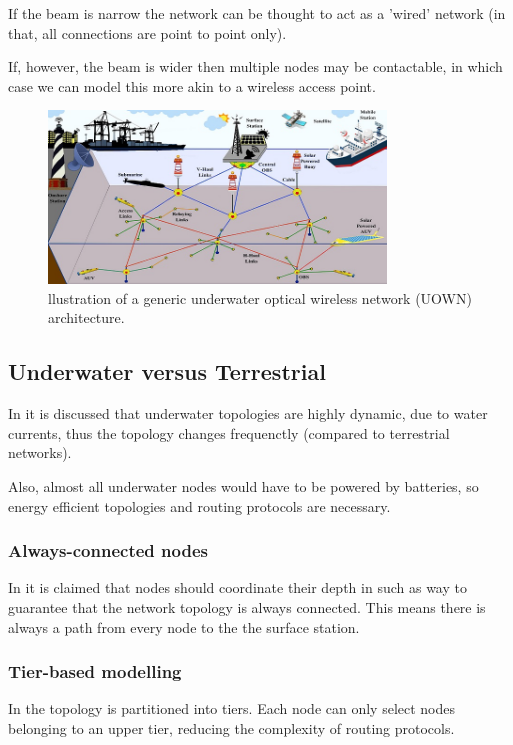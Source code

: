 If the beam is narrow the network can be thought to act as a 'wired' network
(in that, all connections are point to point only).

If, however, the beam is wider then multiple nodes may be contactable, in which
case we can model this more akin to a wireless access point.

\begin{figure}[H]
  \includegraphics[width=0.8\textwidth]{underwater_network_topologies_v2.jpg}
  \caption{llustration of a generic underwater optical wireless network (UOWN) architecture.}
  \label{fig:underwater_network_topologies_v2}
\end{figure}

\subsection{Underwater versus Terrestrial}
In \cite{s16030414} it is discussed that underwater topologies are highly
dynamic, due to water currents, thus the topology changes frequenctly
(compared to terrestrial networks).

Also, almost all underwater nodes would have to be powered by batteries,
so energy efficient topologies and routing protocols are necessary.

\subsubsection{Always-connected nodes}
In \cite{POMPILI2009778} it is claimed that nodes should coordinate their
depth in such as way to guarantee that the network topology is always connected.
This means there is always a path from every node to the the surface station.

\subsubsection{Tier-based modelling}
In \cite{tier_based_underwater_routing} the topology is partitioned into tiers.
Each node can only select nodes belonging to an upper tier, reducing the
complexity of routing protocols.